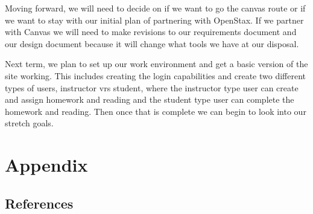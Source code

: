 \documentclass[onecolumn, draftclsnofoot,10pt, compsoc]{IEEEtran}
\begin{document}
Moving forward, we will need to decide on if we want to go the canvas route or if we want to stay with our initial plan of partnering with OpenStax. If we partner with Canvas we will need to make revisions to our requirements document and our design document because it will change what tools we have at our disposal.

Next term, we plan to set up our work environment and get a basic version of the site working. This includes creating the login capabilities and create two different types of users, instructor vrs student,  where the instructor type user can create and assign homework and reading and the student type user can complete the homework and reading. Then once that is complete we can begin to look into our stretch goals.

\section{Appendix}

\subsection{References}
  
 
\end{document}
